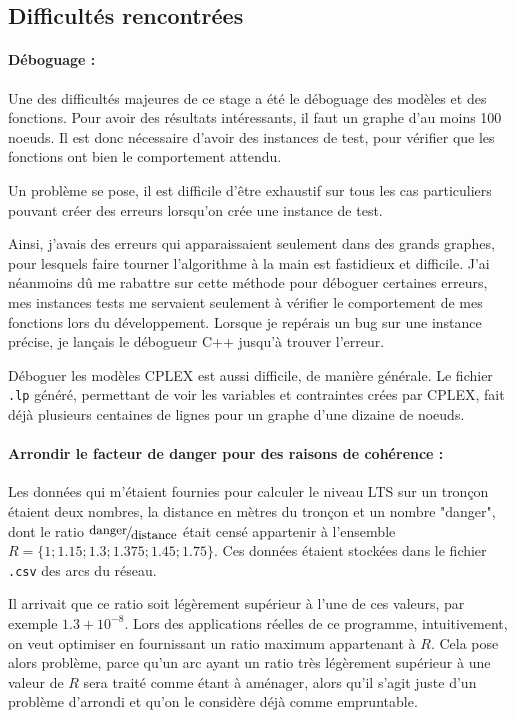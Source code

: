 \subsection{Difficultés rencontrées}\label{sect:diff}

\paragraph{Déboguage :}

Une des difficultés majeures de ce stage a été le déboguage des modèles et des fonctions. Pour avoir des résultats intéressants, il faut un graphe d'au moins 100 noeuds. Il est donc nécessaire d'avoir des instances de test, pour vérifier que les fonctions ont bien le comportement attendu.

Un problème se pose, il est difficile d'être exhaustif sur tous les cas particuliers pouvant créer des erreurs lorsqu'on crée une instance de test.

Ainsi, j'avais des erreurs qui apparaissaient seulement dans des grands graphes, pour lesquels faire tourner l'algorithme à la main est fastidieux et difficile. J'ai néanmoins dû me rabattre sur cette méthode pour déboguer certaines erreurs, mes instances tests me servaient seulement à vérifier le comportement de mes fonctions lors du développement. Lorsque je repérais un bug sur une instance précise, je lançais le débogueur C++ jusqu'à trouver l'erreur.

Déboguer les modèles CPLEX est aussi difficile, de manière générale. Le fichier \verb|.lp| généré, permettant de voir les variables et contraintes crées par CPLEX, fait déjà plusieurs centaines de lignes pour un graphe d'une dizaine de noeuds.


\paragraph{Arrondir le facteur de danger pour des raisons de cohérence :}

Les données qui m'étaient fournies pour calculer le niveau LTS sur un tronçon étaient deux nombres, la distance en mètres du tronçon et un nombre "danger", dont le ratio $\fFrac{\text{danger}}{\text{distance}}$ était censé appartenir à l'ensemble $R=\{1; 1.15; 1.3; 1.375; 1.45; 1.75\}$. Ces données étaient stockées dans le fichier \verb|.csv| des arcs du réseau.

Il arrivait que ce ratio soit légèrement supérieur à l'une de ces valeurs, par exemple $1.3+10^{-8}$. Lors des applications réelles de ce programme, intuitivement, on veut optimiser en fournissant un ratio maximum appartenant à $R$. Cela pose alors problème, parce qu'un arc ayant un ratio très légèrement supérieur à une valeur de $R$ sera traité comme étant à aménager, alors qu'il s'agit juste d'un problème d'arrondi et qu'on le considère déjà comme empruntable.

